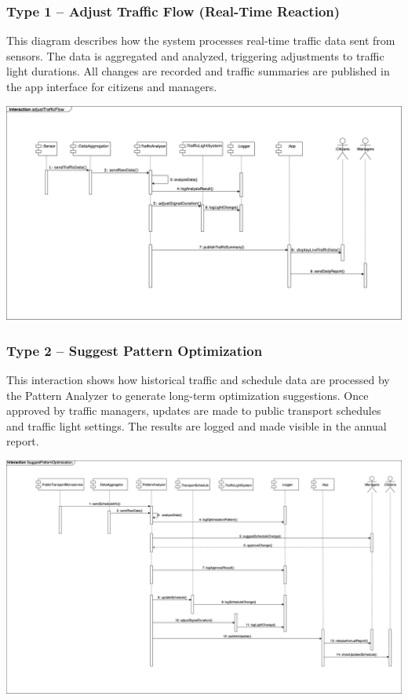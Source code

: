 \vspace{1em}
\subsubsection*{Type 1 – Adjust Traffic Flow (Real-Time Reaction)}

This diagram describes how the system processes real-time traffic data sent from sensors. The data is aggregated and analyzed, triggering adjustments to traffic light durations. All changes are recorded and traffic summaries are published in the app interface for citizens and managers.

\begin{center}
    \includegraphics[width=1\textwidth]{Images/t1.sequence.png}
\end{center}





\newpage
\vspace{1em}
\subsubsection*{Type 2 – Suggest Pattern Optimization}

This interaction shows how historical traffic and schedule data are processed by the Pattern Analyzer to generate long-term optimization suggestions. Once approved by traffic managers, updates are made to public transport schedules and traffic light settings. The results are logged and made visible in the annual report.

\begin{center}
    \includegraphics[width=1\textwidth]{Images/t2.sequence.png}
\end{center}

